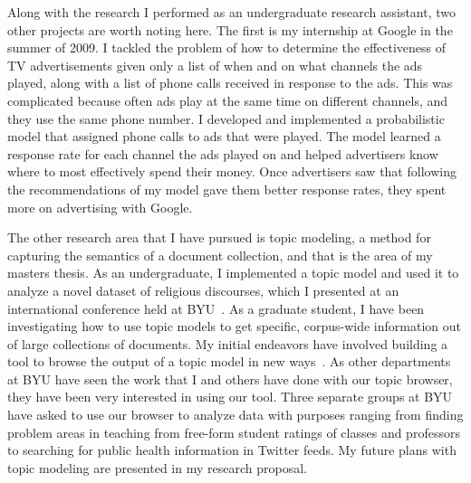 \documentclass[onecolumn, 12pt]{article}
\begin{document}
Along with the research I performed as an undergraduate research assistant, two
other projects are worth noting here.  The first is my internship at Google in
the summer of 2009.  I tackled the problem of how to determine the
effectiveness of TV advertisements given only a list of when and on what
channels the ads played, along with a list of phone calls received in response
to the ads.  This was complicated because often ads play at the same time on
different channels, and they use the same phone number.  I developed and
implemented a probabilistic model that assigned phone calls to ads that were
played.  The model learned a response rate for each channel the ads played on
and helped advertisers know where to most effectively spend their money.  Once
advertisers saw that following the recommendations of my model gave them better
response rates, they spent more on advertising with Google.

The other research area that I have pursued is topic modeling, a method for
capturing the semantics of a document collection, and that is the area of my
masters thesis.  As an undergraduate, I implemented a topic model and used it
to analyze a novel dataset of religious discourses, which I presented at an
international conference held at
BYU~\cite{gardner-2010-general-conference-topics}.  As a graduate student, I
have been investigating how to use topic models to get specific, corpus-wide
information out of large collections of documents.  My initial endeavors have
involved building a tool to browse the output of a topic model in new
ways~\cite{gardner-2010-topic-browser}.  As other departments at BYU have seen
the work that I and others have done with our topic browser, they have been
very interested in using our tool.  Three separate groups at BYU have asked to
use our browser to analyze data with purposes ranging from finding problem
areas in teaching from free-form student ratings of classes and professors to
searching for public health information in Twitter feeds.  My future plans with
topic modeling are presented in my research proposal.

\footnotesize

\renewcommand\bibsection{\noindent \small\textbf{Publications}\vspace{-2mm}\footnotesize}

\end{document}
